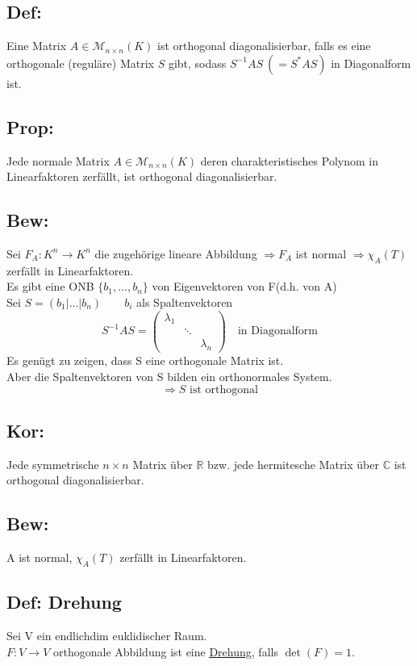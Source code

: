 \documentclass[titlepage,12pt,a4paper,ngerman]{report}
\newcommand{\tx}[1]{\textrm{#1}}
\newcommand{\basis}[3]{\{#1_{#2}, \dots, #1_{#3}\}}
\newcommand{\dmat}[3]{\begin{pmatrix} #1_{#2}&&\\ &\ddots& \\ && #1_{#3} \end{pmatrix}}
\begin{document}
\subsection{Def:}
Eine Matrix $ A \in \mathcal{M}_{n \times n}(K) $ ist orthogonal diagonalisierbar, falls es eine orthogonale (reguläre) Matrix $ S $ gibt, sodass $ S^{-1} A S  \ (= S^* A S)$ in Diagonalform ist.

\subsection{Prop:}
Jede normale Matrix $ A \in \mathcal{M}_{n \times n}(K) $ deren charakteristisches Polynom in Linearfaktoren zerfällt, ist orthogonal diagonalisierbar.

\subsection{Bew:}
Sei $ F_A: K^n \to K^n $ die zugehörige lineare Abbildung $ \Rightarrow  F_A $ ist normal $ \Rightarrow \chi_A(T) $ zerfällt in Linearfaktoren.\\
Es gibt eine ONB $ \basis{b}{1}{n} $ von Eigenvektoren von F(d.h. von A)\\
Sei $ S = (b_1| \dots | b_n) \qquad b_i$ als Spaltenvektoren
$$S^{-1} A S = \dmat{\lambda}{1}{n} \quad \tx{in Diagonalform}$$
Es genügt zu zeigen, dass S eine orthogonale Matrix ist.\\
Aber die Spaltenvektoren von S bilden ein orthonormales System.\\
$$\Rightarrow S \tx{ ist orthogonal} $$

\subsection{Kor:}
Jede symmetrische $ n \times n $ Matrix über $ \mathbb{R} $ bzw. jede hermitesche Matrix über $ \mathbb{C} $ ist orthogonal diagonalisierbar.

\subsection{Bew:}
A ist normal, $ \chi_A(T) $ zerfällt in Linearfaktoren.

\subsection{Def: Drehung}
Sei V ein endlichdim euklidischer Raum.\\
$ F: V \to V $ orthogonale Abbildung ist eine \underline{\underline{Drehung}}, falls $ \det(F) = 1 $.
\end{document}
